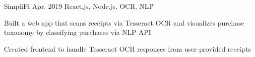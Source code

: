 \begin{cvprojects}


  \cvproject
  {SimpliFi}
  {\href{https://github.com/unitehenry/simply-finance}{\faGithubSquare\acvHeaderIconSep{}}}
  {Apr. 2019}
  {React.js, Node.js, OCR, NLP}
  {
    \begin{cvitems}
      \item {Built a web app that scans receipts via Tesseract OCR and visualizes purchase taxonomy by classifying purchases via NLP API}
      \item {Created frontend to handle Tesseract OCR responses from user-provided receipts}
    \end{cvitems}
  }


\end{cvprojects}